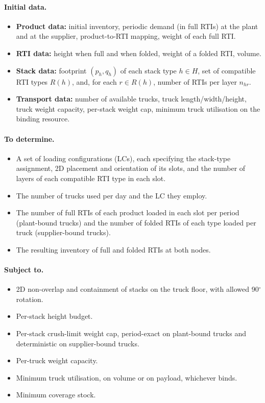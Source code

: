 {{\paragraph{Initial data.}
\begin{itemize}
    \item \textbf{Product data:} initial inventory, periodic demand
    (in full RTIs) at the plant and at the supplier, product-to-RTI
    mapping, weight of each full RTI.
    \item \textbf{RTI data:} height when full and when folded, weight
    of a folded RTI, volume.
    \item \textbf{Stack data:} footprint $(p_h, q_h)$ of each stack
    type $h\in H$, set of compatible RTI types $R(h)$, and, for each
    $r\in R(h)$, number of RTIs per layer $n_{hr}$.
    \item \textbf{Transport data:} number of available trucks, truck
    length/width/height, truck weight capacity, per-stack weight cap,
    minimum truck utilisation on the binding resource.
\end{itemize}
}

\paragraph{To determine.}
\begin{itemize}
    \item A set of loading configurations (LCs), each specifying the
    stack-type assignment, 2D placement and orientation of its slots,
    and the number of layers of each compatible RTI type in each slot.
    \item The number of trucks used per day and the LC they employ.
    \item The number of full RTIs of each product loaded in each slot
    per period (plant-bound trucks) and the number of folded RTIs of
    each type loaded per truck (supplier-bound trucks).
    \item The resulting inventory of full and folded RTIs at both
    nodes.
\end{itemize}

{\color{blue}
\paragraph{Subject to.}
\begin{itemize}
    \item 2D non-overlap and containment of stacks on the truck floor,
    with allowed 90$^\circ$ rotation.
    \item Per-stack height budget.
    \item Per-stack crush-limit weight cap, period-exact on plant-bound
    trucks and deterministic on supplier-bound trucks.
    \item Per-truck weight capacity.
    \item Minimum truck utilisation, on volume or on payload,
    whichever binds.
    \item Minimum coverage stock.
\end{itemize}
}

}
